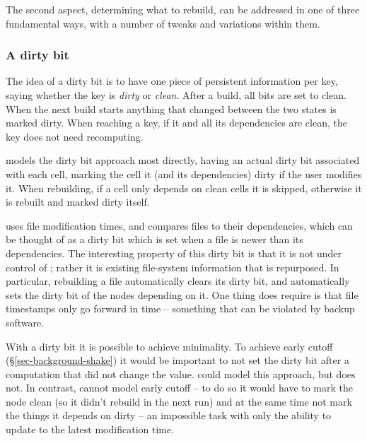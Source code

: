 The second aspect, determining what to rebuild, can be addressed in one of three
fundamental ways, with a number of tweaks and variations within them.

\subsubsection{A dirty bit}\label{sec-dirty-bit}

The idea of a dirty bit is to have one piece of persistent
information per key, saying whether the key is
\emph{dirty} or \emph{clean}. After a build, all bits are set to clean. When the
next build starts anything that changed between the two states is marked
dirty.
When reaching a key, if it and all its dependencies are
clean, the key does not need recomputing.

\Excel models the dirty bit approach most directly, having an actual dirty bit
associated with each cell, marking the cell it (and its dependencies) dirty
if the user modifies it.
When rebuilding,
if a cell only depends on clean cells it is skipped, otherwise it is rebuilt and
marked dirty itself.


\Make uses file modification times, and compares files to their
dependencies, which can be thought of as a dirty bit which is set when
a file is newer than its dependencies. The interesting property of
this dirty bit is that it is not under control of \Make; rather it is
existing file-system information that is repurposed. In particular,
rebuilding a file automatically clears its dirty bit, and
automatically sets the dirty bit of the nodes depending on it. One
thing \Make does require is that file timestamps only go forward in
time -- something that can be violated by backup software.

With a dirty bit it is possible to achieve minimality. To achieve early cutoff
(\S\ref{sec-background-shake}) it would be important to not set the dirty bit
after a computation that did not change the value. \Excel could model this
approach, but does not. In contrast, \Make cannot model early cutoff -- to do so
it would have to mark the node clean (so it didn't rebuild in the next run) and
at the same time not mark the things it depends on dirty -- an impossible task
with only the ability to update to the latest modification time.

